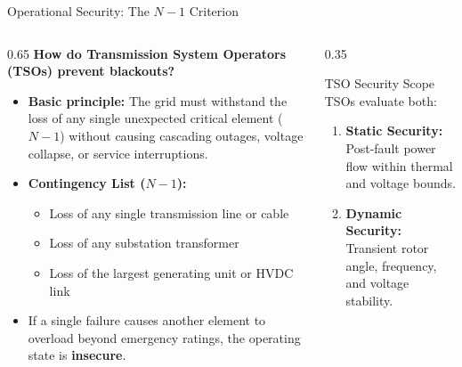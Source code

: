 \begin{frame}{Operational Security: The $N-1$ Criterion}
\begin{columns}[T]
\begin{column}{0.65\textwidth}
    \footnotesize
    \textbf{How do Transmission System Operators (TSOs) prevent blackouts?}
    \begin{itemize}
        \item \textbf{Basic principle:} The grid must withstand the loss of any single unexpected critical element ($N-1$) without causing cascading outages, voltage collapse, or service interruptions.
        \item \textbf{Contingency List ($N-1$):}
        \begin{itemize}
            \item Loss of any single transmission line or cable
            \item Loss of any substation transformer
            \item Loss of the largest generating unit or HVDC link
        \end{itemize}
        \item If a single failure causes another element to overload beyond emergency ratings, the operating state is \alert{\textbf{insecure}}.
    \end{itemize}
\end{column}
\begin{column}{0.35\textwidth}
    \begin{block}{TSO Security Scope}
    \scriptsize
    TSOs evaluate both:
    \begin{enumerate}
        \item \textbf{Static Security:} Post-fault power flow within thermal and voltage bounds.
        \item \textbf{Dynamic Security:} Transient rotor angle, frequency, and voltage stability.
    \end{enumerate}
    \end{block}
\end{column}
\end{columns}
\end{frame}

